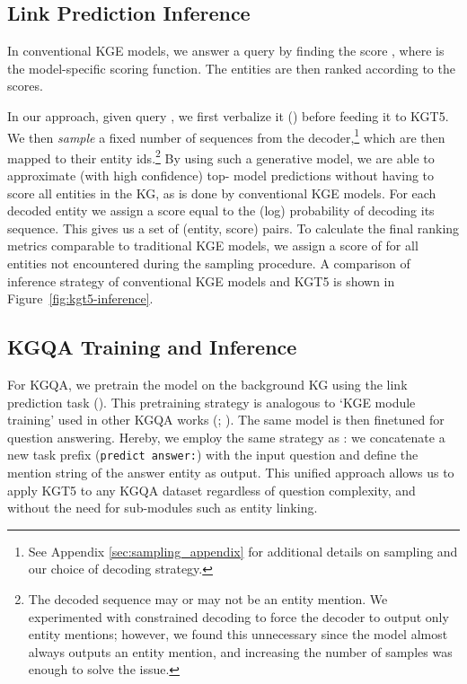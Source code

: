 \documentclass[11pt]{article}
\renewcommand\:{\colon} \newcommand{\sset}[1]{\left\{\,#1\,\right\}} \newcommand{\ssets}[1]{\left\{#1\right\}} \newcommand{\ssetn}[1]{\{\,#1\,\}}
\newcommand{\method}{\textsc{KGT5}}
\begin{document}
\subsection{Link Prediction Inference}
\label{sec:lp_inference}
In conventional KGE models, we answer a query   by finding the score , where  is the model-specific scoring function. The entities  are then ranked according to the scores.

In our approach, given query , we first verbalize it () before feeding it to KGT5.
We then \textit{sample} a fixed number of sequences from the decoder,\footnote{See Appendix \ref{sec:sampling_appendix} for additional details on sampling and our choice of decoding strategy.} which are then mapped to their entity ids.\footnote{
    The decoded sequence may or may not be an entity mention. We experimented with constrained decoding \cite{decao2020autoregressive} to force the decoder to output only entity mentions; however, we found this unnecessary since the model almost always outputs an entity mention, and increasing the number of samples was enough to solve the issue.
}
By using such a generative model, we are able to approximate (with high confidence) top- model predictions without having to score all entities in the KG, as is done by conventional KGE models.
For each decoded entity we assign a score equal to the (log) probability of decoding its sequence. This gives us a set of (entity, score) pairs. 
To calculate the final ranking metrics comparable to traditional KGE models, we assign a score of  for all entities not encountered during the sampling procedure. A comparison of inference strategy of conventional KGE models and \method{} is shown in Figure~\ref{fig:kgt5-inference}.







\subsection{KGQA Training and Inference}
\label{sec:kgqa_training_and_inference}
For KGQA, we pretrain the model on the background KG using the link prediction task (). This pretraining strategy is analogous to `KGE module training' used in other KGQA works (\citealt{sun2021faithful}; \citealt{ren2021lego}). The same model is then finetuned for question answering.
Hereby, we employ the same strategy as \citet{roberts-etal-2020-much}: we concatenate a new task prefix (\texttt{predict answer:}) with the input question and define the mention string of the answer entity as output. 
This unified approach allows us to apply \method{} to any KGQA dataset regardless of question complexity, and without the need for sub-modules such as entity linking.
\end{document}

